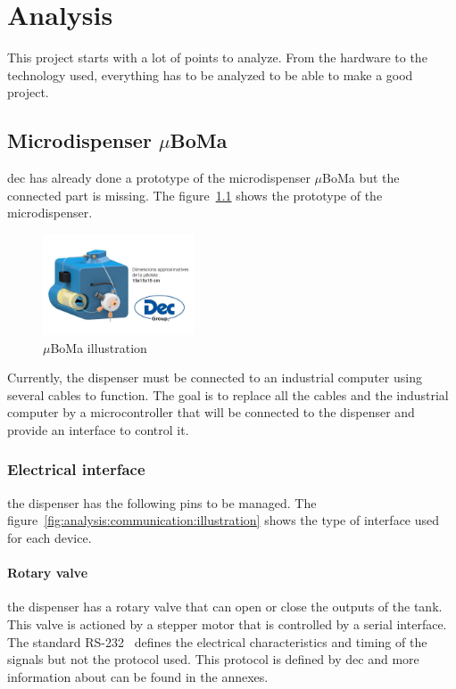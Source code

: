 \chapter{Analysis}
\label{ch:analysis}
This project starts with a lot of points to analyze.
From the hardware to the technology used, everything has to be analyzed to be able to make a good project.


\section{Microdispenser $\mu$BoMa}
\label{sec:microdispenser}
\acrshort{dec} has already done a prototype of the microdispenser $\mu$BoMa but the connected part is missing.
The figure~\ref{fig:analysis:microdispenser:protype} shows the prototype of the microdispenser.

\begin{figure}[ht]
    \centering
    \includegraphics[width=0.4\textwidth]{img/logo}
    \caption{$\mu$BoMa illustration}
    \label{fig:analysis:microdispenser:protype}\end{figure}

Currently, the dispenser must be connected to an industrial computer using several cables to function.
The goal is to replace all the cables and the industrial computer by a microcontroller that will be connected to the dispenser and provide an interface to control it.


\subsection{Electrical interface}
\label{subsec:interface}
the dispenser has the following pins to be managed.
The figure~\ref{fig:analysis:communication:illustration} shows the type of interface used for each device.

\subsubsection{Rotary valve}
\label{subsubsec:serial}
the dispenser has a rotary valve that can open or close the outputs of the tank.
This valve is actioned by a stepper motor that is controlled by a serial interface.
The standard RS-232~\cite{rs-232} defines the electrical characteristics and timing of the signals but not the protocol used.
This protocol is defined by \acrshort{dec} and more information about can be found in the annexes.

